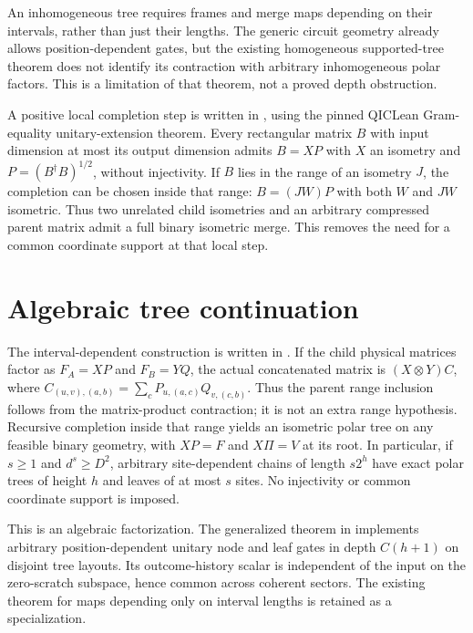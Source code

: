 \documentclass{article}
\begin{document}
An inhomogeneous tree requires frames and merge maps depending on their
intervals, rather than just their lengths. The generic circuit geometry
already allows position-dependent gates, but the existing homogeneous
supported-tree theorem does not identify its contraction with arbitrary
inhomogeneous polar factors. This is a limitation of that theorem, not a
proved depth obstruction.

A positive local completion step is written in
, using the pinned
QICLean Gram-equality unitary-extension theorem. Every rectangular matrix
$B$ with input dimension at most its output dimension admits $B=XP$ with
$X$ an isometry and $P=(B^\dagger B)^{1/2}$, without injectivity. If $B$
lies in the range of an isometry $J$, the completion can be chosen inside
that range: $B=(JW)P$ with both $W$ and $JW$ isometric. Thus two unrelated
child isometries and an arbitrary compressed parent matrix admit a full
binary isometric merge. This removes the need for a common coordinate
support at that local step.

\section{Algebraic tree continuation}
The interval-dependent construction is written in
. If the child
physical matrices factor as $F_A=XP$ and $F_B=YQ$, the actual concatenated
matrix is $(X\otimes Y)C$, where
$C_{(u,v),(a,b)}=\sum_cP_{u,(a,c)}Q_{v,(c,b)}$.
Thus the parent range inclusion follows from the matrix-product
contraction; it is not an extra range hypothesis. Recursive completion
inside that range yields an isometric polar tree on any feasible binary
geometry, with $XP=F$ and $X\Pi=V$ at its root. In particular, if
$s\ge1$ and $d^s\ge D^2$, arbitrary site-dependent chains of length
$s2^h$ have exact polar trees of height $h$ and leaves of at most $s$
sites. No injectivity or common coordinate support is imposed.

This is an algebraic factorization. The generalized theorem in
 implements
arbitrary position-dependent unitary node and leaf gates in depth
$C(h+1)$ on disjoint tree layouts. Its outcome-history scalar is
independent of the input on the zero-scratch subspace, hence common
across coherent sectors. The existing theorem for maps depending only
on interval lengths is retained as a specialization.
\end{document}
